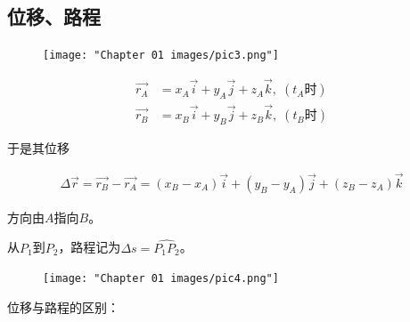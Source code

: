 \documentclass[
	12pt, %
	a4paper, %
]{myLegrandOrangeBook}
\begin{document}
\subsection{位移、路程}

    \begin{figure}[!htbp]
        \centering
        \texttt{[image: "Chapter 01 images/pic3.png"]}
        \label{pic3}
    \end{figure}
    
    \begin{definition}

        \begin{align*}
            \overrightarrow{r_{A}} &=
            x_{A}\overrightarrow{i} + y_{A}\overrightarrow{j} + z_{A}\overrightarrow{k}
            ,\; \left(t_{A}\text{时}\right) \\
            \overrightarrow{r_{B}} &=
            x_{B}\overrightarrow{i} + y_{B}\overrightarrow{j} + z_{B}\overrightarrow{k}
            ,\; \left(t_{B}\text{时}\right)
        \end{align*}

        于是其位移

        \begin{align}
            \Delta \overrightarrow{r} = \overrightarrow{r_{B}} - \overrightarrow{r_{A}}
            = \left(x_{B} - x_{A}\right)\overrightarrow{i} + \left(y_{B} - y_{A}\right)\overrightarrow{j}
            + \left(z_{B} - z_{A}\right)\overrightarrow{k}
        \end{align}
        
        方向由\(A\)指向\(B\)。
    
    \end{definition}

    \vspace{1em}
    \begin{definition}

        从\(P_{1}\)到\(P_{2}\)，路程记为\(\Delta s = \hat{P_{1}P_{2}}\)。

    \end{definition}

    \begin{figure}[!htbp]
        \centering
        \texttt{[image: "Chapter 01 images/pic4.png"]}
        \label{pic4}
    \end{figure}

    位移与路程的区别：
\end{document}

